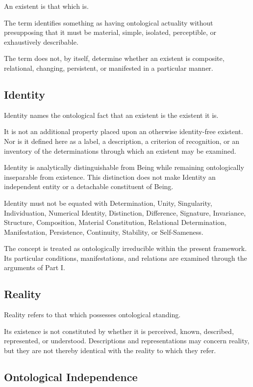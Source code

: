 An existent is that which is.

The term identifies something as having ontological actuality without
presupposing that it must be material, simple, isolated, perceptible,
or exhaustively describable.

The term does not, by itself, determine whether an existent is composite,
relational, changing, persistent, or manifested in a particular manner.


\subsection*{Identity}

Identity names the ontological fact that an existent is the existent
it is.

It is not an additional property placed upon an otherwise identity-free
existent. Nor is it defined here as a label, a description, a criterion
of recognition, or an inventory of the determinations through which
an existent may be examined.

Identity is analytically distinguishable from Being while remaining
ontologically inseparable from existence. This distinction does not
make Identity an independent entity or a detachable constituent of Being.

Identity must not be equated with Determination, Unity, Singularity,
Individuation, Numerical Identity, Distinction, Difference, Signature,
Invariance, Structure, Composition, Material Constitution, Relational
Determination, Manifestation, Persistence, Continuity, Stability,
or Self-Sameness.

The concept is treated as ontologically irreducible within the present
framework. Its particular conditions, manifestations, and relations
are examined through the arguments of Part I.


\subsection*{Reality}

Reality refers to that which possesses ontological standing.

Its existence is not constituted by whether it is perceived, known,
described, represented, or understood. Descriptions and representations
may concern reality, but they are not thereby identical with the reality
to which they refer.


\subsection*{Ontological Independence}

